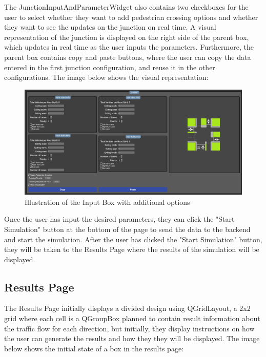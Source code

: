 \documentclass{article}
\begin{document}
        The JunctionInputAndParameterWidget also contains two checkboxes for the user to select whether they want to add pedestrian crossing options and whether they want to see the updates on the junction on real time. A visual representation of the
        junction is displayed on the right side of the parent box, which updates in real time as the user inputs the parameters. Furthermore, the parent box contains copy and paste buttons, where the user can copy the data entered 
        in the first junction configuration, and reuse it in the other configurations. The image below shows the visual representation:

        \begin{figure}[H]
            \centering
            \includegraphics[width=\textwidth]{inputExtra.png}
            \caption{Illustration of the Input Box with additional options}
            \label{fig:inputExtra}
        \end{figure}

        Once the user has input the desired parameters, they can click the "Start Simulation" button at the bottom of the page to send the data to the backend and start the simulation. After the user has clicked the "Start Simulation" button, they
        will be taken to the Results Page where the results of the simulation will be displayed.

        
    \subsection{Results Page}
        
        The Results Page initially displays a divided design using QGridLayout, a 2x2 grid where each cell is a QGroupBox planned to contain result information about the traffic flow for each direction, but initially,
        they display instructions on how the user can generate the results and how they they will be displayed. The image below shows the initial state of a box in the results page:
\end{document}
